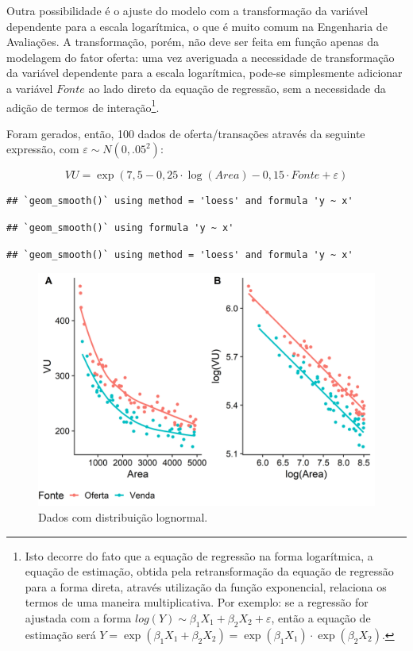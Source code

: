 \documentclass{article}
\begin{document}
Outra possibilidade é o ajuste do modelo com a transformação da variável
dependente para a escala logarítmica, o que é muito comum na Engenharia
de Avaliações. A transformação, porém, não deve ser feita em função
apenas da modelagem do fator oferta: uma vez averiguada a necessidade de
transformação da variável dependente para a escala logarítmica, pode-se
simplesmente adicionar a variável \(Fonte\) ao lado direto da equação de
regressão, sem a necessidade da adição de termos de interação\footnote{Isto
  decorre do fato que a equação de regressão na forma logarítmica, a
  equação de estimação, obtida pela retransformação da equação de
  regressão para a forma direta, através utilização da função
  exponencial, relaciona os termos de uma maneira multiplicativa. Por
  exemplo: se a regressão for ajustada com a forma
  \(log(Y) \sim \beta_1 X_1 + \beta_2 X_2 + \varepsilon\), então a
  equação de estimação será
  \(Y = \exp(\beta_1 X_1 + \beta_2 X_2) = \exp(\beta_1 X_1)\cdot \exp(\beta_2 X_2)\).}.

Foram gerados, então, 100 dados de oferta/transações através da seguinte
expressão, com \(\varepsilon \sim N(0, .05^2)\):

\[VU = \exp(7,5 - 0,25\cdot \log(Area) - 0,15\cdot Fonte + \varepsilon)\]

\begin{verbatim}
## `geom_smooth()` using method = 'loess' and formula 'y ~ x'
\end{verbatim}

\begin{verbatim}
## `geom_smooth()` using formula 'y ~ x'
\end{verbatim}

\begin{verbatim}
## `geom_smooth()` using method = 'loess' and formula 'y ~ x'
\end{verbatim}

\begin{figure}
\centering
\includegraphics{./images/dados2-1.png}
\caption{Dados com distribuição lognormal.}
\end{figure}
\end{document}
